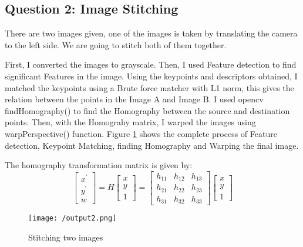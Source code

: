 \documentclass[a4paper, 10pt]{article}
\begin{document}
\begin{multicols}{2}
\begin{comment}
		\begin{figure*}
		\centering
		\texttt{[image: /Q1/ARDetectionUsingFFt.png]}
		\caption{Projecting the Testudo image on the ARTag}
		\label{fig:ARTa1g}
		\end{figure*}
		
		\end{comment}
		
		
		\section{Question 2: Image Stitching}
		There are two images given, one of the images is taken by translating the camera to the left side. We are going to stitch both of them together. 
		
		First, I converted the images to grayscale. Then, I used Feature detection to find significant Features in the image. Using the keypoints and descriptors obtained, I matched the keypoints using a Brute force matcher with L1 norm, this gives the relation between the points in the Image A and Image B. I used opencv findHomography() to find the Homography between the source and destination points. Then, with the Homograhy matrix, I warped the images using warpPerspective() function. Figure \ref{fig:op2} shows the complete process of Feature detection, Keypoint Matching, finding Homography and Warping the final image.
		
		The homography transformation matrix is given by:
		\[
		\begin{bmatrix}
		x^{'} \\
		y^{'} \\
		w
		\end{bmatrix} =
		H\begin{bmatrix}
		x \\
		y \\
		1
		\end{bmatrix} = 
		\begin{bmatrix}
		h_{11} & h_{12} & h_{13}\\
		h_{21} & h_{22} & h_{23}\\
		h_{31} & h_{32} & h_{33}
		\end{bmatrix}
		\begin{bmatrix}
		x \\
		y \\
		1
		\end{bmatrix}
		\]
		
		\begin{figure}[H]
			\centering
			\texttt{[image: /output2.png]}
			\caption{Stitching two images}
			\label{fig:op2}
		\end{figure}
		

\end{multicols}
\end{document}
